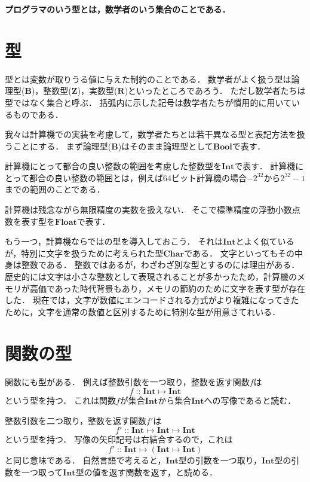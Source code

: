 \documentclass[twocolumn]{jsbook}
\newenvironment{leader}{\begingroup\bf}{\endgroup}
\newcommand{\hsklType}[1]{\textbf{#1}}
\newcommand{\hsklBool}{\hsklType{Bool}}
\newcommand{\hsklChar}{\hsklType{Char}}
\newcommand{\hsklInt}{\hsklType{Int}}
\newcommand{\hsklFloat}{\hsklType{Float}}
\DeclareMathOperator{\mathIn}{::}
\DeclareMathOperator{\mathMapsTo}{\mapsto}
\newcommand{\mathSet}[1]{\mathbf{#1}}
\newcommand{\mathMorph}[2]{#1\mathMapsTo#2}
\newcommand{\mathMorphII}[3]{#1\mathMapsTo#2\mathMapsTo#3}
\newcommand{\mathMorphIIWithParenthesis}[3]{#1\mathMapsTo(#2\mathMapsTo#3)}
\begin{document}
\begin{leader}
プログラマのいう型とは，数学者のいう集合のことである．
\end{leader}


\section{型}

型とは変数が取りうる値に与えた制約のことである．
数学者がよく扱う型は論理型($\mathSet{B}$)，整数型($\mathSet{Z}$)，実数型($\mathSet{R}$)といったところであろう．
ただし数学者たちは型ではなく集合と呼ぶ．
括弧内に示した記号は数学者たちが慣用的に用いているものである．

我々は計算機での実装を考慮して，数学者たちとは若干異なる型と表記方法を扱うことにする．
まず論理型($\mathSet{B}$)はそのまま論理型として$\hsklBool$で表す．

計算機にとって都合の良い整数の範囲を考慮した整数型を$\hsklInt$で表す．
計算機にとって都合の良い整数の範囲とは，例えば64ビット計算機の場合$-2^{32}$から$2^{32}-1$までの範囲のことである．

計算機は残念ながら無限精度の実数を扱えない．
そこで標準精度の浮動小数点数を表す型を$\hsklFloat$で表す．

もう一つ，計算機ならではの型を導入しておこう．
それは$\hsklInt$とよく似ているが，特別に文字を扱うために考えられた型$\hsklChar$である．
文字といってもその中身は整数である．
整数ではあるが，わざわざ別な型とするのには理由がある．
歴史的には文字は小さな整数として表現されることが多かったため，計算機のメモリが高価であった時代背景もあり，メモリの節約のために文字を表す型が存在した．
現在では，文字が数値にエンコードされる方式がより複雑になってきたために，文字を通常の数値と区別するために特別な型が用意さてれいる．

\section{関数の型}

関数にも型がある．
例えば整数引数を一つ取り，整数を返す関数$f$は$$f\mathIn\mathMorph{\hsklInt}{\hsklInt}$$という型を持つ．
これは関数$f$が集合$\hsklInt$から集合$\hsklInt$への写像であると読む．

整数引数を二つ取り，整数を返す関数$f'$は$$f'\mathIn\mathMorphII{\hsklInt}{\hsklInt}{\hsklInt}$$という型を持つ．
写像の矢印記号は右結合するので，これは$$f'\mathIn\mathMorphIIWithParenthesis{\hsklInt}{\hsklInt}{\hsklInt}$$と同じ意味である．
自然言語で考えると，$\hsklInt$型の引数を一つ取り，$\hsklInt$型の引数を一つ取って$\hsklInt$型の値を返す関数を返す，と読める．
\end{document}
